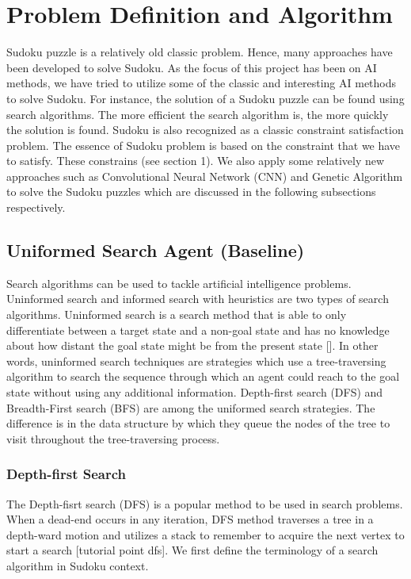 \section{Problem Definition and Algorithm}

Sudoku puzzle is a relatively old classic problem. Hence, many approaches have been developed to solve Sudoku. As the focus of this project has been on AI methods, we have tried to utilize some of the classic and interesting AI methods to solve Sudoku. For instance, the solution of a Sudoku puzzle can be found using search algorithms. The more efficient the search algorithm is, the more quickly the solution is found. Sudoku is also recognized as a classic constraint satisfaction problem. The essence of Sudoku problem is based on the constraint that we have to satisfy. These constrains (see section 1). We also apply some relatively new approaches such as Convolutional Neural Network (CNN) and Genetic Algorithm to solve the Sudoku puzzles which are discussed in the following subsections respectively. 

\subsection{Uniformed Search Agent (Baseline)}
Search algorithms can be used to tackle artificial intelligence problems. Uninformed search and informed search with heuristics are two types of search algorithms. Uninformed search is a search method that is able to only differentiate between a target state and a non-goal state and has no knowledge about how distant the goal state might be from the present state []. In other words, uninformed search techniques are strategies which use a tree-traversing algorithm to search the sequence through which an agent could reach to the goal state without using any additional information. Depth-first search (DFS) and Breadth-First search (BFS) are among the uniformed search strategies. The difference is in the data structure by which they queue the nodes of the tree to visit throughout the tree-traversing process.

\subsubsection{Depth-first Search}
The Depth-fisrt search (DFS) is a popular method to be used in search problems. When a dead-end occurs in any iteration, DFS method traverses a tree in a depth-ward motion and utilizes a stack to remember to acquire the next vertex to start a search [tutorial point dfs]. We first define the terminology of a search algorithm in Sudoku context. 

